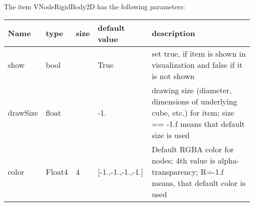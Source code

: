 The item VNodeRigidBody2D has the following parameters:
\begin{center}
  \footnotesize
  \begin{longtable}{| p{4.5cm} | p{2.5cm} | p{0.5cm} | p{2.5cm} | p{6cm} |}
    \hline
    \bf Name & \bf type & \bf size & \bf default value & \bf description \\ \hline
    show &     bool &      &     True &     set true, if item is shown in visualization and false if it is not shown\\ \hline
    drawSize &     float &      &     -1. &     drawing size (diameter, dimensions of underlying cube, etc.)  for item; size == -1.f means that default size is used\\ \hline
    color &     Float4 &     4 &     [-1.,-1.,-1.,-1.] &     Default RGBA color for nodes; 4th value is alpha-transparency; R=-1.f means, that default color is used\\ \hline
	  \end{longtable}
	\end{center}

